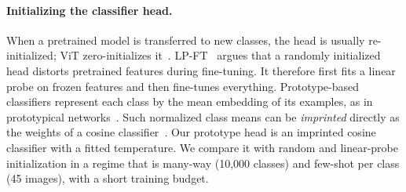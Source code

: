 \paragraph{Initializing the classifier head.}
When a pretrained model is transferred to new classes, the head is usually re-initialized; ViT zero-initializes it~\cite{dosovitskiy2021vit}.
LP-FT~\cite{kumar2022lpft} argues that a randomly initialized head distorts pretrained features during fine-tuning.
It therefore first fits a linear probe on frozen features and then fine-tunes everything.
Prototype-based classifiers represent each class by the mean embedding of its examples, as in prototypical networks~\cite{snell2017prototypical}.
Such normalized class means can be \emph{imprinted} directly as the weights of a cosine classifier~\cite{qi2018imprinted}.
Our prototype head is an imprinted cosine classifier with a fitted temperature.
We compare it with random and linear-probe initialization in a regime that is many-way (10,000 classes) and few-shot per class (45 images), with a short training budget.

